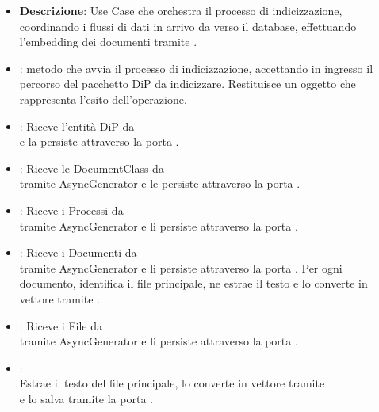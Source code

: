 \begin{itemize}
    \item \textbf{Descrizione}: Use Case che orchestra il processo di indicizzazione, coordinando i flussi di dati in arrivo da  verso il database, effettuando l'embedding dei documenti tramite .
    \item {}: metodo che avvia il processo di indicizzazione, accettando in ingresso il percorso del pacchetto DiP da indicizzare. Restituisce un oggetto  che rappresenta l'esito dell'operazione.
    \item {}: Riceve l'entità DiP da \\
     e la persiste attraverso la porta .
    \item {}: Riceve le DocumentClass da \\ tramite AsyncGenerator e le persiste attraverso la porta .
    \item {}: Riceve i Processi da \\ tramite AsyncGenerator e li persiste attraverso la porta .
    \item {}: Riceve i Documenti da \\ tramite AsyncGenerator e li persiste attraverso la porta . Per ogni documento, identifica il file principale, ne estrae il testo e lo converte in vettore tramite .
    \item {}: Riceve i File da\\
     tramite AsyncGenerator e li persiste attraverso la porta .
    \item {}:\\
    Estrae il testo del file principale, lo converte in vettore tramite\\
     e lo salva tramite la porta .
\end{itemize}

